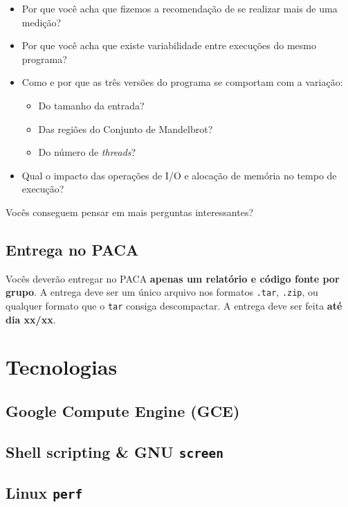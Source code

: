 \documentclass[final,12pt,a4paper]{elsarticle}
\begin{document}
\begin{itemize}
    \item Por que você acha que fizemos a recomendação de se realizar
    mais de uma medição?
    \item Por que você acha que existe variabilidade entre execuções do mesmo
    programa?
    \item Como e por que as três versões do programa se comportam com a variação:
        \begin{itemize}
            \item Do tamanho da entrada?
            \item Das regiões do Conjunto de Mandelbrot?
            \item Do número de \textit{threads}?
        \end{itemize}
    \item Qual o impacto das operações de I/O e alocação de memória no tempo de
    execução?
\end{itemize}

Vocês conseguem pensar em mais perguntas interessantes?

\subsection{Entrega no PACA}

Vocês deverão entregar no PACA \textbf{apenas um relatório e código fonte por
grupo}. A entrega deve ser um único arquivo nos formatos \texttt{.tar},
\texttt{.zip}, ou qualquer formato que o \texttt{tar} consiga descompactar.
A entrega deve ser feita \textbf{até dia xx/xx}.

\section{Tecnologias}

\subsection{Google Compute Engine (GCE)}

\subsection{Shell scripting \& GNU \texttt{screen}}

\subsection{Linux \texttt{perf}}
\end{document}
